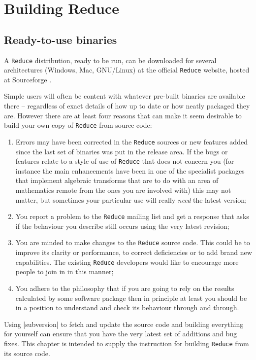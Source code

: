 \documentclass[12pt,twoside,openright]{memoir}
\newcommand{\reduce}{\texttt{Reduce}\xspace}
\begin{document}
\chapter{Building Reduce}
\label{cha:building-reduce}

\section{Ready-to-use binaries}

A \reduce distribution, ready to be run, can be downloaded for several
architectures (Windows, Mac, GNU/Linux) at the official \reduce website, hosted
at Sourceforge \cite{sourceforge}.

Simple users will often be content with whatever pre-built binaries
are available there -- regardless of exact details of how up to date or how
neatly packaged they are. However there are at least four reasons that can
make it seem desirable to build your own copy of \reduce from source code:
\begin{enumerate}
\item Errors may have been corrected in the \reduce sources or new
features added since the last set of binaries was put in the release area.
If the bugs or features relate to a style of use of \reduce that does not
concern you (for instance the main enhancements have been in one of
the specialist packages that implement algebraic transforms that are to
do with an area of mathematics remote from the ones you are involved
with) this may not matter, but sometimes your particular use will really {\em
need} the latest version;
\item You report a problem to the \reduce mailing list and get a response
that asks if the behaviour you describe still occurs using the very latest
revision;
\item You are minded to make changes to the \reduce source code. This could
be to improve its clarity or performance, to correct deficiencies or to
add brand new capabilities. The existing \reduce developers would like
to encourage more people to join in in this manner;
\item You adhere to the philosophy that if you are going to rely on the
results calculated by some software package then in principle at least
you should be in a position to understand and check its behaviour through
and through.
\end{enumerate}

Using |subversion| to fetch and update the source code and building everything
for yourself can ensure that you have the very latest set of additions and bug
fixes.  This chapter is intended to supply the instruction for building \reduce
from its source code.
\end{document}

